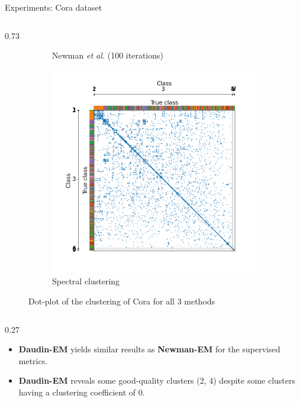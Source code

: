 \documentclass[final]{beamer}
\newlength{\colwidth}
\begin{document}
\begin{frame}[t]
\begin{columns}[t]
\begin{column}{\colwidth}
\begin{block}{Experiments: Cora dataset}
\begin{column}{0.73\colwidth}
\begin{figure}[H]
\begin{subfigure}{0.45\linewidth}
              \caption{Newman \textit{et al.} (100 iterations)}
              \label{fig:cora_newman}
            \end{subfigure}
            \hspace{0.5em}
            \begin{subfigure}{0.45\linewidth}
              \centering
              \includegraphics[width=\linewidth, trim={45 25 35 40}, clip]{figures/cora_spetral.png}
              \caption{Spectral clustering}
              \label{fig:cora_spectral}
            \end{subfigure}
            \hfill
            \caption{\centering Dot-plot of the clustering of Cora for all $3$ methods}
            \label{fig:cora_results}
          \end{figure}
        \end{column}
        \begin{column}{0.27\colwidth}
          \vspace{4em}
          \begin{itemize} \setlength\itemsep{1.5em}
            \justifying
            \item \textbf{Daudin-EM} yields similar results as \textbf{Newman-EM} for the supervised metrics.
            \item \textbf{Daudin-EM} reveals some good-quality clusters (2, 4) despite some clusters having a clustering coefficient of 0.

\end{itemize}
\end{column}
\end{block}
\end{column}
\end{columns}
\end{frame}
\end{document}
